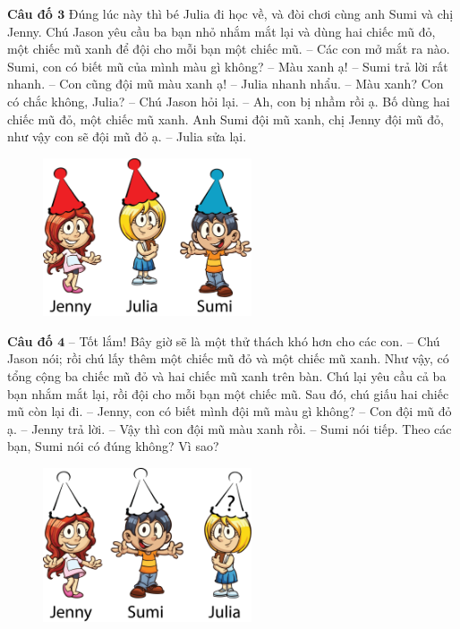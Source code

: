 	\textbf{\color{toancuabi}Câu đố $\pmb3$}
	\vskip 0.1cm
	Đúng lúc này thì bé Julia đi học về, và đòi chơi cùng anh Sumi và chị Jenny. Chú Jason yêu cầu ba bạn nhỏ nhắm mắt lại và dùng hai chiếc mũ đỏ, một chiếc mũ xanh để đội cho mỗi bạn một chiếc mũ.
	\vskip 0.1cm
	-- Các con mở mắt ra nào. Sumi, con có biết mũ của mình màu gì không?
	\vskip 0.1cm
	-- Màu xanh ạ! -- Sumi trả lời rất nhanh.
	\vskip 0.1cm
	-- Con cũng đội mũ màu xanh ạ! -- Julia  nhanh nhẩu.
	\vskip 0.1cm
	-- Màu xanh? Con có chắc không, Julia? -- Chú Jason hỏi lại.
	\vskip 0.1cm
	-- Ah, con bị nhầm rồi ạ. Bố dùng hai chiếc mũ đỏ, một chiếc mũ xanh. Anh Sumi đội mũ xanh, chị Jenny đội mũ đỏ, như vậy con sẽ đội mũ đỏ ạ. – Julia sửa lại.
	\begin{figure}[H]
	\centering
	\vspace*{-5pt}
	\captionsetup{labelformat= empty, justification=centering}
	\includegraphics[width=0.55\textwidth]{h3}
	\vspace*{-10pt}
	\end{figure}
	
	\textbf{\color{toancuabi}Câu đố $\pmb4$}
	\vskip 0.1cm
	-- Tốt lắm! Bây giờ sẽ là một thử thách khó hơn cho các con. -- Chú Jason nói; rồi chú lấy thêm một chiếc mũ đỏ và một chiếc mũ xanh. Như vậy, có tổng cộng ba chiếc mũ đỏ và hai chiếc mũ xanh trên bàn. Chú lại yêu cầu cả ba bạn nhắm mắt lại, rồi đội cho mỗi bạn một chiếc mũ. Sau đó, chú giấu hai chiếc mũ còn lại đi.
	\vskip 0.1cm
	-- Jenny, con có biết mình đội mũ màu gì không?
	\vskip 0.1cm
	-- Con đội mũ đỏ ạ. -- Jenny trả lời.
	\vskip 0.1cm
	-- Vậy thì con đội mũ màu xanh rồi. -- Sumi  nói tiếp.
	\vskip 0.1cm
	Theo các bạn, Sumi nói có đúng không? Vì sao?
	\begin{figure}[H]
		\centering
		\vspace*{-5pt}
		\captionsetup{labelformat= empty, justification=centering}
		\includegraphics[width=0.55\textwidth]{h5}
		\vspace*{-10pt}
	\end{figure}
	
